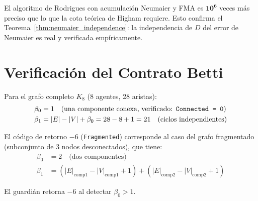 El algoritmo de Rodrigues con acumulación Neumaier y FMA es $\mathbf{10^6}$ veces más
preciso que lo que la cota teórica de Higham requiere. Esto confirma el Teorema~\ref{thm:neumaier_independence}:
la independencia de $D$ del error de Neumaier es real y verificada empíricamente.

\section{Verificación del Contrato Betti}

Para el grafo completo $K_8$ (8 agentes, 28 aristas):
\begin{align}
\beta_0 &= 1 \quad \text{(una componente conexa, verificado: \texttt{Connected = 0})} \\
\beta_1 &= |E| - |V| + \beta_0 = 28 - 8 + 1 = 21 \quad \text{(ciclos independientes)}
\end{align}

El código de retorno $-6$ (\texttt{Fragmented}) corresponde al caso del grafo fragmentado
(subconjunto de 3 nodos desconectados), que tiene:
\begin{align}
\beta_0 &= 2 \quad \text{(dos componentes)} \\
\beta_1 &= (|E|_{\text{comp1}} - |V|_{\text{comp1}} + 1) + (|E|_{\text{comp2}} - |V|_{\text{comp2}} + 1)
\end{align}

El guardián retorna $-6$ al detectar $\beta_0 > 1$.
